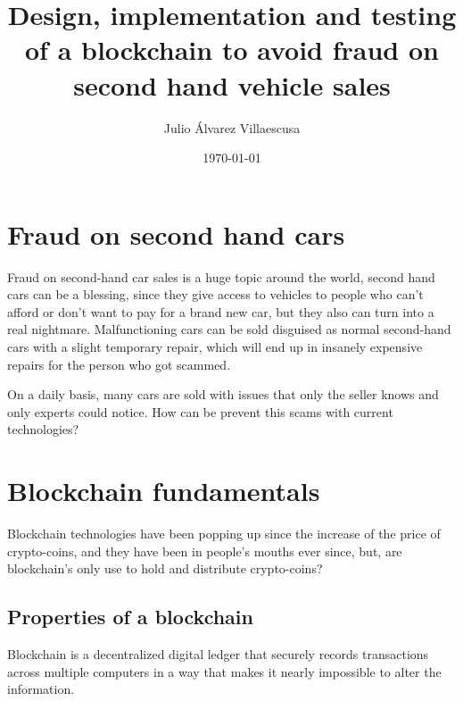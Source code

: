 \documentclass[twocolumn]{article} %
\begin{document}
\title{Design, implementation and testing of a blockchain to avoid fraud on second hand vehicle sales}
\author{Julio Álvarez Villaescusa}
\date{\today}
\maketitle


\section{Fraud on second hand cars}
Fraud on second-hand car sales is a huge topic around the world, second hand cars can be a blessing, since they give access to vehicles to people who can't afford or don't want to pay for a brand new car, but they also can turn into a real nightmare. Malfunctioning cars can be sold disguised as normal second-hand cars with a slight temporary repair, which will end up in insanely expensive repairs for the person who got scammed.

On a daily basis, many cars are sold with issues that only the seller knows and only experts could notice. How can be prevent this scams with current technologies?

\section{Blockchain fundamentals}
Blockchain technologies have been popping up since the increase of the price of crypto-coins, and they have been in people's mouths ever since, but, are blockchain's only use to hold and distribute crypto-coins?

\subsection{Properties of a blockchain}
Blockchain is a decentralized digital ledger that securely records transactions across multiple computers in a way that makes it nearly impossible to alter the information.\\
\end{document}
